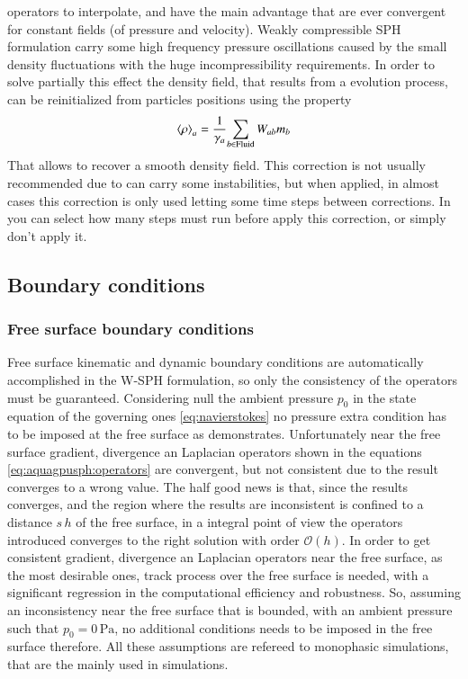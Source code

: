 operators to interpolate, and have the main advantage that are ever convergent for
constant fields (of pressure and velocity).\rc
%
Weakly compressible SPH formulation carry some high frequency pressure oscillations
caused by the small density fluctuations with the huge incompressibility requirements.
In order to solve partially this effect the density field, that results from a
evolution process, can be reinitialized from particles positions using the property
%
\begin{eqnarray}
\displaystyle{\left\langle \rho \right\rangle_a} =  
\displaystyle{\frac{1}{\gamma_a}} \displaystyle{ \sum\limits_{b \in \mathrm{Fluid}} W_{ab} m_b}
\end{eqnarray}
%
That allows to recover a smooth density field. This correction is not usually
recommended due to can carry some instabilities, but when applied, in almost cases
this correction is only used letting some time steps between corrections. In \NAME
you can select how many steps must run before apply this correction, or simply don't
apply it.
%
\subsection{Boundary conditions}
%
\subsubsection{Free surface boundary conditions}
%
Free surface kinematic and dynamic boundary conditions are automatically accomplished
in the W-SPH formulation, so only the consistency of the operators must be guaranteed.
%
Considering null the ambient pressure $p_0$ in the state equation of the governing
ones \ref{eq:navierstokes} no pressure extra condition has to be imposed at the free
surface as \citet{Colagrossi2009} demonstrates.\rc
%
Unfortunately near the free surface gradient, divergence an Laplacian operators shown in the
equations \ref{eq:aquagpusph:operators} are convergent, but not consistent due to the
result converges to a wrong value. The half good news is that, since the results converges,
and the region where the results are inconsistent is confined to a distance $s \, h$ of
the free surface, in a integral point of view the operators introduced converges to the
right solution with order $\mathcal{O}(h)$.\rc
%
In order to get consistent gradient, divergence an Laplacian operators near the free surface,
as the most desirable ones, track process over the free surface is needed, with a significant
regression in the computational efficiency and robustness.\rc
%
So, assuming an inconsistency near the free surface that is bounded, with an ambient pressure
such that $p_0 = 0 \, \mbox{Pa}$, no additional conditions needs to be imposed in the free
surface therefore.\rc
%
All these assumptions are refereed to monophasic simulations, that are the mainly used in \NAME
simulations.
%
